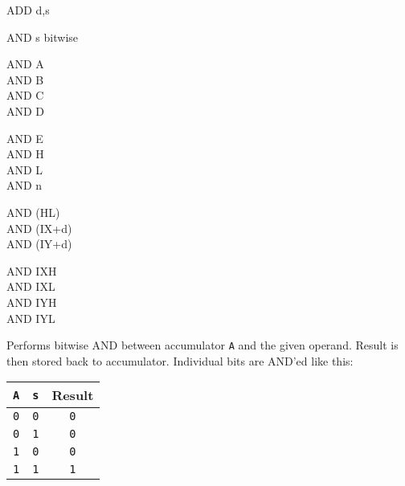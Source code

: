 \begin{basedescript}{
    \desclabelstyle{\multilinelabel}
    \desclabelwidth{3cm}}
\begin{DetailItem}{ADD d,s}
    \end{DetailItem}

    \begin{DetailItem}{AND s}
        {bitwise }
        {}

        \begin{DetailVariants}[4]
            AND A\\
            AND B\\
            AND C\\
            AND D

            \columnbreak
            AND E\\
            AND H\\
            AND L\\
            AND n
			
            \columnbreak
            AND (HL)\\
            AND (IX+d)\\
            AND (IY+d)

            \columnbreak
            AND IXH\UNDOC\\
            AND IXL\UNDOC\\
            AND IYH\UNDOC\\
            AND IYL\UNDOC
        \end{DetailVariants}

        Performs bitwise AND between accumulator {\tt A} and the given operand. Result is then stored back to accumulator. Individual bits are AND'ed like this:

        \begin{tabular}{cc|c}
            {\tt A} & {\tt s} & Result \\
            \hline
            {\tt 0} & {\tt 0} & {\tt 0} \\
            {\tt 0} & {\tt 1} & {\tt 0} \\
            {\tt 1} & {\tt 0} & {\tt 0} \\
            {\tt 1} & {\tt 1} & {\tt 1} \\
        \end{tabular}

        \begin{DetailEffects}[p]
            \FlagsANDr
        \end{DetailEffects}

        \begin{DetailTiming}
        \end{DetailTiming}


\end{DetailItem}
\end{basedescript}
